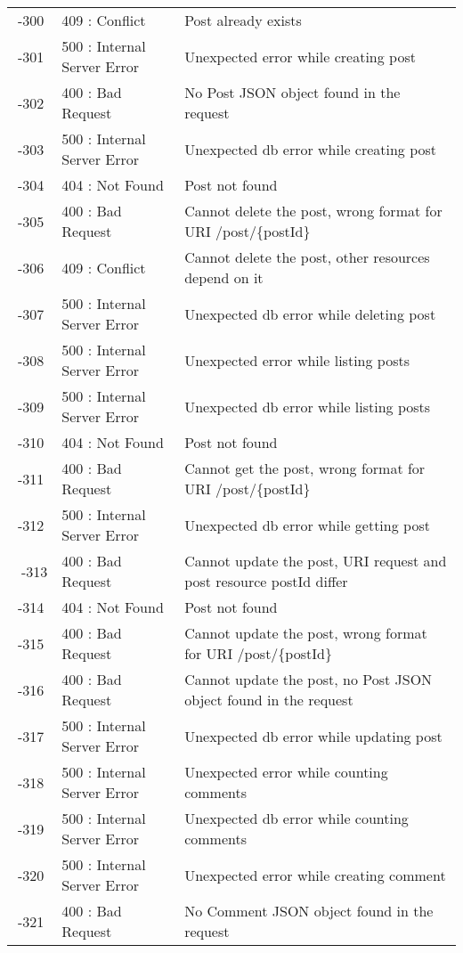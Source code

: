 \begin{longtable}{ | c | l | p{} | }
-300 & 409 : Conflict               & Post already exists \\
-301 & 500 : Internal Server Error  & Unexpected error while creating post \\
-302 & 400 : Bad Request            & No Post JSON object found in the request \\
-303 & 500 : Internal Server Error  & Unexpected db error while creating post \\
-304 & 404 : Not Found              & Post not found \\
-305 & 400 : Bad Request            & Cannot delete the post, wrong format for URI /post/\{postId\} \\
-306 & 409 : Conflict               & Cannot delete the post, other resources depend on it \\
-307 & 500 : Internal Server Error  & Unexpected db error while deleting post \\
-308 & 500 : Internal Server Error  & Unexpected error while listing posts \\
-309 & 500 : Internal Server Error  & Unexpected db error while listing posts \\
-310 & 404 : Not Found              & Post not found \\
-311 & 400 : Bad Request            & Cannot get the post, wrong format for URI /post/\{postId\} \\
-312 & 500 : Internal Server Error  & Unexpected db error while getting post \\\
-313 & 400 : Bad Request            & Cannot update the post, URI request and post resource postId differ \\
-314 & 404 : Not Found              & Post not found \\
-315 & 400 : Bad Request            & Cannot update the post, wrong format for URI /post/\{postId\} \\
-316 & 400 : Bad Request            & Cannot update the post, no Post JSON object found in the request \\
-317 & 500 : Internal Server Error  & Unexpected db error while updating post \\
-318 & 500 : Internal Server Error  & Unexpected error while counting comments \\
-319 & 500 : Internal Server Error  & Unexpected db error while counting comments \\
-320 & 500 : Internal Server Error  & Unexpected error while creating comment \\
-321 & 400 : Bad Request            & No Comment JSON object found in the request \\

\end{longtable}
